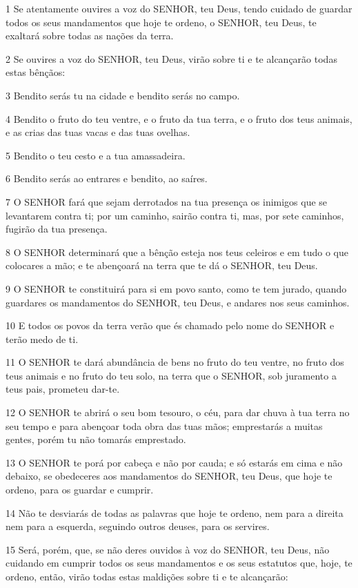 \par 1 Se atentamente ouvires a voz do SENHOR, teu Deus, tendo cuidado de guardar todos os seus mandamentos que hoje te ordeno, o SENHOR, teu Deus, te exaltará sobre todas as nações da terra.
\par 2 Se ouvires a voz do SENHOR, teu Deus, virão sobre ti e te alcançarão todas estas bênçãos:
\par 3 Bendito serás tu na cidade e bendito serás no campo.
\par 4 Bendito o fruto do teu ventre, e o fruto da tua terra, e o fruto dos teus animais, e as crias das tuas vacas e das tuas ovelhas.
\par 5 Bendito o teu cesto e a tua amassadeira.
\par 6 Bendito serás ao entrares e bendito, ao saíres.
\par 7 O SENHOR fará que sejam derrotados na tua presença os inimigos que se levantarem contra ti; por um caminho, sairão contra ti, mas, por sete caminhos, fugirão da tua presença.
\par 8 O SENHOR determinará que a bênção esteja nos teus celeiros e em tudo o que colocares a mão; e te abençoará na terra que te dá o SENHOR, teu Deus.
\par 9 O SENHOR te constituirá para si em povo santo, como te tem jurado, quando guardares os mandamentos do SENHOR, teu Deus, e andares nos seus caminhos.
\par 10 E todos os povos da terra verão que és chamado pelo nome do SENHOR e terão medo de ti.
\par 11 O SENHOR te dará abundância de bens no fruto do teu ventre, no fruto dos teus animais e no fruto do teu solo, na terra que o SENHOR, sob juramento a teus pais, prometeu dar-te.
\par 12 O SENHOR te abrirá o seu bom tesouro, o céu, para dar chuva à tua terra no seu tempo e para abençoar toda obra das tuas mãos; emprestarás a muitas gentes, porém tu não tomarás emprestado.
\par 13 O SENHOR te porá por cabeça e não por cauda; e só estarás em cima e não debaixo, se obedeceres aos mandamentos do SENHOR, teu Deus, que hoje te ordeno, para os guardar e cumprir.
\par 14 Não te desviarás de todas as palavras que hoje te ordeno, nem para a direita nem para a esquerda, seguindo outros deuses, para os servires.
\par 15 Será, porém, que, se não deres ouvidos à voz do SENHOR, teu Deus, não cuidando em cumprir todos os seus mandamentos e os seus estatutos que, hoje, te ordeno, então, virão todas estas maldições sobre ti e te alcançarão:
